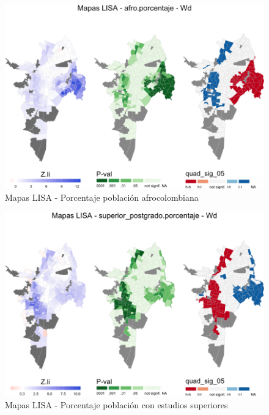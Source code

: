 \documentclass[12pt,a4paper,oneside, openany]{book}
\theoremstyle{definition}
\theoremstyle{definition}
\theoremstyle{definition}
\theoremstyle{remark}
\begin{document}
\begin{figure}[H]

{\centering \includegraphics[width=1\linewidth]{tesis-unigis_files/figure-latex/lisa-afro-1} 

}

\caption{Mapas LISA - Porcentaje población afrocolombiana}\label{fig:lisa-afro}
\end{figure}

\begin{figure}[H]

{\centering \includegraphics[width=1\linewidth]{tesis-unigis_files/figure-latex/lisa-superiores-1} 

}

\caption{Mapas LISA - Porcentaje población con estudios superiores}\label{fig:lisa-superiores}
\end{figure}
\end{document}
